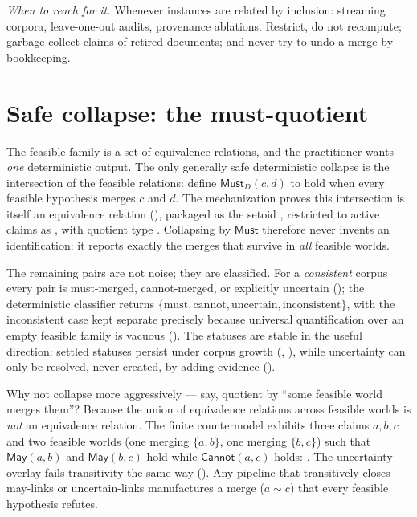 \documentclass[11pt]{article}
\newcommand{\Must}{\mathsf{Must}}
\newcommand{\May}{\mathsf{May}}
\newcommand{\Cannot}{\mathsf{Cannot}}
\begin{document}
\emph{When to reach for it.}  Whenever instances are related by
inclusion: streaming corpora, leave-one-out audits, provenance
ablations.  Restrict, do not recompute; garbage-collect claims of
retired documents; and never try to undo a merge by bookkeeping.

\section{Safe collapse: the must-quotient}
\label{sec:quotient}

The feasible family is a set of equivalence relations, and the
practitioner wants \emph{one} deterministic output.  The only generally
safe deterministic collapse is the intersection of the feasible
relations: define $\Must_D(c,d)$ to hold when every feasible hypothesis
merges $c$ and $d$.  The mechanization proves this intersection is
itself an equivalence relation (), packaged
as the setoid , restricted to active claims as
, with quotient type .
Collapsing by $\Must$ therefore never invents an identification: it
reports exactly the merges that survive in \emph{all} feasible worlds.

The remaining pairs are not noise; they are classified.  For a
\emph{consistent} corpus every pair is must-merged, cannot-merged, or
explicitly uncertain (); the deterministic
classifier  returns
$\{\mathrm{must},\mathrm{cannot},\mathrm{uncertain},
\mathrm{inconsistent}\}$, with the inconsistent case kept separate
precisely because universal quantification over an empty feasible family
is vacuous ().  The statuses
are stable in the useful direction: settled statuses persist under
corpus growth (, ), while
uncertainty can only be resolved, never created, by adding evidence
().

Why not collapse more aggressively --- say, quotient by ``some feasible
world merges them''?  Because the union of equivalence relations across
feasible worlds is \emph{not} an equivalence relation.  The finite
countermodel  exhibits three
claims $a,b,c$ and two feasible worlds (one merging $\{a,b\}$, one
merging $\{b,c\}$) such that $\May(a,b)$ and $\May(b,c)$ hold while
$\Cannot(a,c)$ holds: .  The uncertainty
overlay fails transitivity the same way
().  Any pipeline that
transitively closes may-links or uncertain-links manufactures a merge
($a\sim c$) that every feasible hypothesis refutes.
\end{document}
